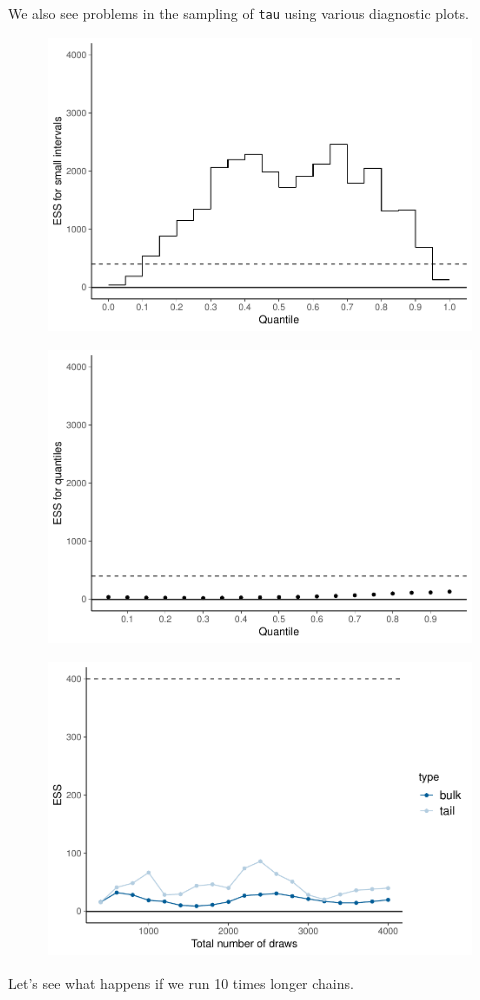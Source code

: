 \documentclass[american,]{article}
\begin{document}
We also see problems in the sampling of \texttt{tau} using various
diagnostic plots.

\begin{figure}[tp]
  \centering
  \includegraphics[width=0.6\linewidth]{graphics/local-ess-jags-cp-tau-1.pdf}
\end{figure}

\begin{figure}[tp]
  \centering
  \includegraphics[width=0.6\linewidth]{graphics/quantile-ess-jags-cp-tau-1.pdf}
\end{figure}

\begin{figure}[tp]
  \centering
  \includegraphics[width=0.6\linewidth]{graphics/change-ess-jags-cp-tau-1.pdf}
\end{figure}

Let's see what happens if we run 10 times longer chains.
\end{document}
